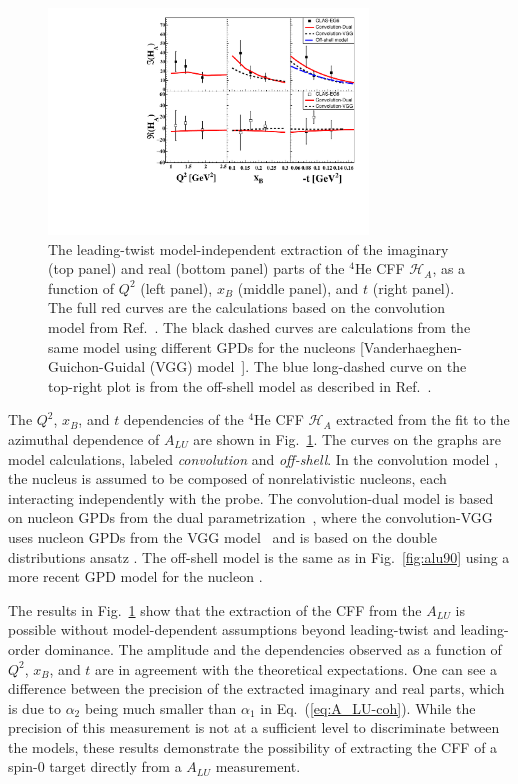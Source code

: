 \documentclass[twocolumn,nofootinbib,prl,superscriptaddress,secnumarabic,amssymb,nobibnotes,aps,floatfix]{revtex4}
\begin{document}
\begin{figure}[tb]
\includegraphics[width=8.5cm]{F_Coherent_CFF.pdf}
\caption{The leading-twist model-independent extraction of the imaginary (top panel) and
real (bottom panel) parts of the $^4$He CFF $\mathcal{H}_A$, as a function of
$Q^{2}$ (left panel), $x_B$ (middle panel), and $t$ (right panel). The full red 
curves are the calculations based on the convolution model from Ref.~\cite{Vadim_priv}.
The black dashed curves are calculations from the same model using different 
GPDs for the nucleons [Vanderhaeghen-Guichon-Guidal (VGG) 
model~\cite{Guidal:2004nd}]. The blue long-dashed curve on the top-right plot 
is from the off-shell model as described in 
Ref.~\cite{GonzalezHernandez:2012jv}.}
\label{fig:CFF_HA}
\end{figure}

The $Q^2$, $x_B$, and $t$ dependencies of the $^4$He CFF $\mathcal{H}_A$ 
extracted from the fit to the azimuthal dependence of $A_{LU}$ are shown in 
Fig.~\ref{fig:CFF_HA}. The curves on the graphs are model calculations, labeled 
{\it convolution} and {\it off-shell}. In the convolution model 
\cite{Vadim_priv}, the nucleus is assumed to be composed of nonrelativistic 
nucleons, each interacting independently with the probe. The convolution-dual 
model is based on nucleon GPDs from the dual 
parametrization~\cite{Guzey:2006xi}, where the convolution-VGG uses nucleon 
GPDs from the VGG model~\cite{Guidal:2004nd} and is based on the double 
distributions ansatz \cite{DD_model}. The off-shell model is the same as in 
Fig.~\ref{fig:alu90} using a more recent
GPD model for the nucleon \cite{GonzalezHernandez:2012jv}.

The results in Fig.~\ref{fig:CFF_HA} show that the extraction of the CFF
from the $A_{LU}$ is possible without model-dependent assumptions beyond
leading-twist and leading-order dominance. The amplitude and the dependencies 
observed as a function of 
$Q^{2}$, $x_B$, and $t$ are in agreement with the theoretical expectations. One 
can see a difference between the precision of the extracted imaginary and real 
parts, which is due to $\alpha_2$ being much smaller than $\alpha_1$ in
Eq.~(\ref{eq:A_LU-coh}). While the precision of this measurement is not at a
sufficient level to discriminate between the models, these results demonstrate
the possibility of extracting the CFF of a spin-0 target directly from a $A_{LU}$
measurement.
\end{document}

